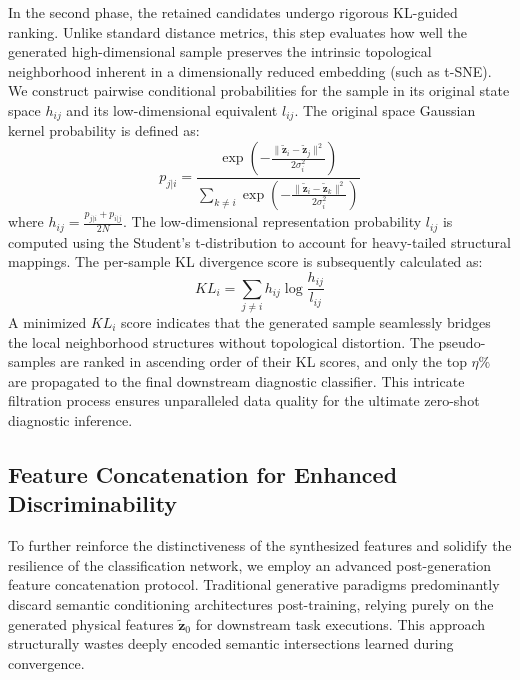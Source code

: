 In the second phase, the retained candidates undergo rigorous KL-guided ranking. Unlike standard distance metrics, this step evaluates how well the generated high-dimensional sample preserves the intrinsic topological neighborhood inherent in a dimensionally reduced embedding (such as t-SNE). We construct pairwise conditional probabilities for the sample in its original state space $h_{ij}$ and its low-dimensional equivalent $l_{ij}$.
The original space Gaussian kernel probability is defined as:
\begin{equation}
p_{j|i} = \frac{\exp\left( -\frac{\| \tilde{\mathbf{z}}_i - \tilde{\mathbf{z}}_j \|^2}{2\sigma_i^2} \right)}{\sum_{k \neq i} \exp\left( -\frac{\| \tilde{\mathbf{z}}_i - \tilde{\mathbf{z}}_k \|^2}{2\sigma_i^2} \right)}
\end{equation}
where $h_{ij} = \frac{p_{j|i} + p_{i|j}}{2N}$. The low-dimensional representation probability $l_{ij}$ is computed using the Student's t-distribution to account for heavy-tailed structural mappings.
The per-sample KL divergence score is subsequently calculated as:
\begin{equation}
KL_i = \sum_{j \neq i} h_{ij} \log \frac{h_{ij}}{l_{ij}}
\end{equation}
A minimized $KL_i$ score indicates that the generated sample seamlessly bridges the local neighborhood structures without topological distortion. The pseudo-samples are ranked in ascending order of their KL scores, and only the top $\eta\%$ are propagated to the final downstream diagnostic classifier. This intricate filtration process ensures unparalleled data quality for the ultimate zero-shot diagnostic inference.

\subsection{Feature Concatenation for Enhanced Discriminability}
\label{subsec:feature_concatenation}
To further reinforce the distinctiveness of the synthesized features and solidify the resilience of the classification network, we employ an advanced post-generation feature concatenation protocol. Traditional generative paradigms predominantly discard semantic conditioning architectures post-training, relying purely on the generated physical features $\tilde{\mathbf{z}}_0$ for downstream task executions. This approach structurally wastes deeply encoded semantic intersections learned during convergence.

